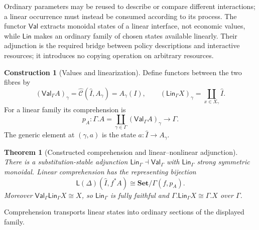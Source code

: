 \documentclass[11pt,a4paper]{article}
\numberwithin{equation}{section}
\newtheorem{theorem}{Theorem}[section]
\theoremstyle{definition}
\newtheorem{construction}[construction]{Construction}
\theoremstyle{remark}
\theoremstyle{plain}
\begin{document}
Ordinary parameters may be reused to describe or compare different
interactions; a linear occurrence must instead be consumed according to
its process. The functor $\mathsf{Val}$ extracts monoidal states of a
linear interface, not economic values, while $\mathsf{Lin}$ makes an
ordinary family of chosen states available linearly. Their adjunction is
the required bridge between policy descriptions and interactive resources;
it introduces no copying operation on arbitrary resources.

\begin{construction}[Values and linearization]
\label{con:egt-lnl}
Define functors between the two fibres by
\[
 (\mathsf{Val}_\Gamma A)_\gamma
    =\widehat{\mathcal C}(\widehat I,A_\gamma)=A_\gamma(I),
 \qquad
 (\mathsf{Lin}_\Gamma X)_\gamma
    =\coprod_{x\in X_\gamma}\widehat I.
\]
For a linear family its comprehension is
\[
 p_A:\Gamma.A=
       \coprod_{\gamma\in\Gamma}(\mathsf{Val}_\Gamma A)_\gamma
       \longrightarrow\Gamma.
\]
The generic element at $(\gamma,a)$ is the state $a:\widehat I\to A_\gamma$.
\end{construction}

\begin{theorem}[Constructed comprehension and linear--nonlinear adjunction]
\label{thm:egt-lnl-comprehension}
There is a substitution-stable adjunction
$\mathsf{Lin}_\Gamma\dashv\mathsf{Val}_\Gamma$ with
$\mathsf{Lin}_\Gamma$ strong symmetric monoidal. Linear comprehension
has the representing bijection
\[
 \mathsf L(\Delta)(\widehat I,f^*A)
 \cong\mathbf{Set}/\Gamma(f,p_A).
\]
Moreover
$\mathsf{Val}_\Gamma\mathsf{Lin}_\Gamma X\cong X$, so
$\mathsf{Lin}_\Gamma$ is fully faithful and
$\Gamma.\mathsf{Lin}_\Gamma X\cong\Gamma.X$ over $\Gamma$.
\end{theorem}

\noindent Comprehension transports linear states into ordinary sections of the displayed family.
\begin{center}
\end{center}
\end{document}
